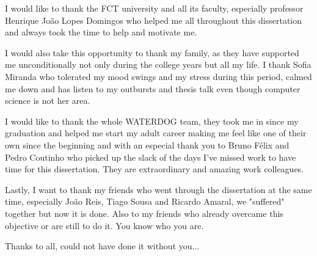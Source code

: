 \acknowledgements

I would like to thank the FCT university and all its faculty, especially professor Henrique João Lopes Domingos who helped me all throughout this dissertation and always took the time to help and motivate me. 

I would also take this opportunity to thank my family, as they have supported me unconditionally not only during the college years but all my life. I thank Sofia Miranda who tolerated my mood swings and my stress during this period, calmed me down and has listen to my outbursts and thesis talk even though computer science is not her area.

I would like to thank the whole WATERDOG team, they took me in since my graduation and helped me start my adult career making me feel like one of their own since the beginning and with an  especial thank you to Bruno Félix and Pedro Coutinho who picked up the slack of the days I've missed work to have time for this dissertation. They are extraordinary and amazing work colleagues.

Lastly, I want to thank my friends who went through the dissertation at the same time, especially João Reis, Tiago Sousa and Ricardo Amaral, we "suffered" together but now it is done. Also to my friends who already overcame this objective or are still to do it. You know who you are.

\vspace{20mm}

Thanks to all, could not have done it without you...
